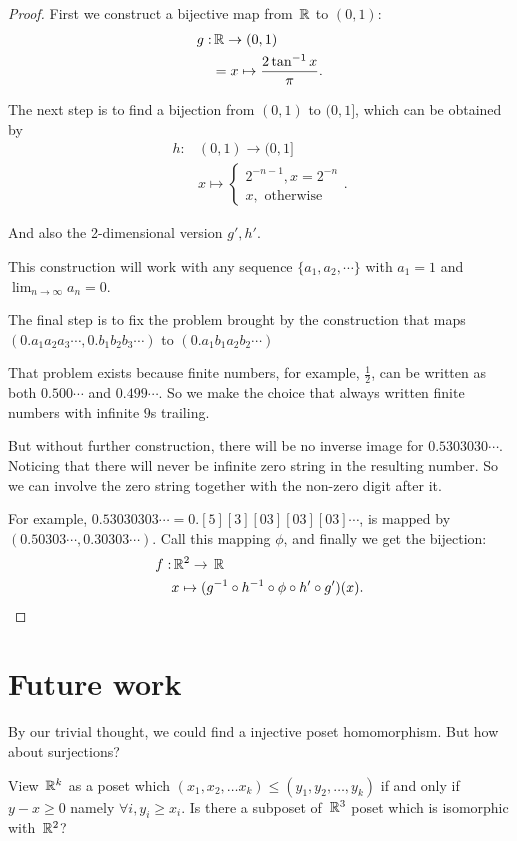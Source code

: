 \begin{proof}
    First we construct a bijective map from $\,\mathbb{R} $ to $(0, 1)$:
    \begin{align*}
        g:& \,\mathbb{R}\to (0,1) \\
          &= x \mapsto \frac{2 \tan^{-1} x}{\pi} 
    .\end{align*}

    The next step is to find a bijection from $(0, 1)$ to $(0, 1]$, which can be obtained by
    \begin{align*}
        h:& (0,1) \to (0,1] \\
          & x \mapsto \begin{cases}
              2^{-n-1}, x = 2^{-n} \\
              x, \text{ otherwise }
          \end{cases} 
    .\end{align*}

    And also the 2-dimensional version $g', h'$.

    This construction will work with any sequence $\{a_1, a_2, \cdots \} $ with $a_1 = 1$ and $\lim_{n\to \infty} a_n = 0$.

    The final step is to fix the problem brought by the construction that maps $(0.a_1a_2a_3\cdots, 0.b_1b_2b_3\cdots ) $ to $(0.a_1b_1a_2b_2\cdots )$

    That problem exists because finite numbers, for example, $\frac{1}{2}$, can be written as both $0.500\cdots $ and $0.499\cdots $. So we make the choice that always written finite numbers with infinite $9$s trailing.

    But without further construction, there will be no inverse image for $0.5303030\cdots $. Noticing that there will never be infinite zero string in the resulting number. So we can involve the zero string together with the non-zero digit after it.

    For example, $0.53030303\cdots = 0.[5][3][03][03][03]\cdots$, is mapped by $(0.50303\cdots ,0.30303\cdots )$. Call this mapping $\phi $, and finally we get the bijection:
    \begin{align*}
        f: &\,\mathbb{R} ^2 \to \,\mathbb{R} \\
           &x \mapsto (g^{-1} \circ h^{-1} \circ \phi \circ h' \circ g' )(x)
    .\end{align*}
\end{proof}


\section{Future work}
By our trivial thought, we could find a injective poset homomorphism. 
But how about surjections?
\begin{pro}
		 View $\,\mathbb{R}^{k}$ as a poset which $\left( x_1,x_2,\ldots x_{k}\right) \le 
		 \left( y_1,y_2,\ldots,y_{k} \right) $ if and only if
		 $y-x\ge 0$ namely $\forall i,y_i \ge  x_i$. Is there
		 a subposet of $\,\mathbb{R}^{3}$ poset which is isomorphic with $\,\mathbb{R}^{2}$?
\end{pro}


